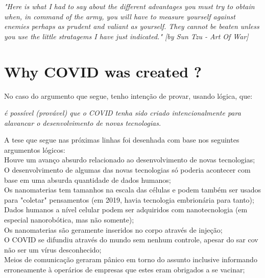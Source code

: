 \documentclass[11pt]{book}
\begin{document}
\noindent \begin{center} \emph{"Here is what I had to say about the different advantages you must try to obtain when, in command of the army, you will have to measure yourself against enemies perhaps as prudent and valiant as yourself. They cannot be beaten unless you use the little stratagems I have just indicated."
[by Sun Tzu - Art Of War]} \end{center}

\chapter{Why COVID was created ?}

No caso do argumento que segue, tenho intenção de provar, usando lógica, que: \\

\noindent \begin{center} \emph{é possível (provável) que o COVID tenha sido criado intencionalmente para alavancar o desenvolvimento de novas tecnologias.} \end{center}

A tese que segue nas próximas linhas foi desenhada com base nos seguintes argumentos lógicos: \\

Houve um avanço absurdo relacionado ao desenvolvimento de novas tecnologias; \\

O desenvolvimento de algumas das novas tecnologias só poderia acontecer com base em uma absurda quantidade de dados humanos; \\

Os nanomaterias tem tamanhos na escala das células e podem também ser usados para "coletar" pensamentos (em 2019, havia tecnologia embrionária para tanto); \\

Dados humanos a nível celular podem ser adquiridos com nanotecnologia (em especial nanorobótica, mas não somente); \\

Os nanomaterias são geramente inseridos no corpo através de injeção; \\

O COVID se difundiu através do mundo sem nenhum controle, apesar do sar cov não ser um vírus desconhecido; \\

Meios de comunicação geraram pânico em torno do assunto inclusive informando erroneamente à operários de empresas que estes eram obrigados a se vacinar; \\
\end{document}
